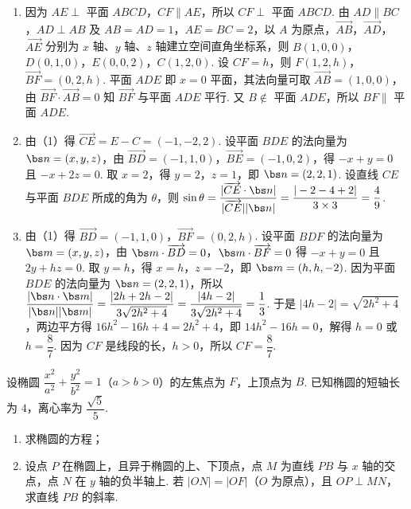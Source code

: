 \begin{solution}
\begin{enumerate}
\item 因为 \(AE\perp\) 平面 \(ABCD\)，\(CF\parallel AE\)，所以 \(CF\perp\) 平面 \(ABCD\). 由 \(AD\parallel BC\)，\(AD\perp AB\) 及 \(AB=AD=1\)，\(AE=BC=2\)，以 \(A\) 为原点，\(\overrightarrow{AB}\)，\(\overrightarrow{AD}\)，\(\overrightarrow{AE}\) 分别为 \(x\) 轴、\(y\) 轴、\(z\) 轴建立空间直角坐标系，则 \(B(1,0,0)\)，\(D(0,1,0)\)，\(E(0,0,2)\)，\(C(1,2,0)\). 设 \(CF=h\)，则 \(F(1,2,h)\)，\(\overrightarrow{BF}=(0,2,h)\). 平面 \(ADE\) 即 \(x=0\) 平面，其法向量可取 \(\overrightarrow{AB}=(1,0,0)\)，由 \(\overrightarrow{BF}\cdot\overrightarrow{AB}=0\) 知 \(\overrightarrow{BF}\) 与平面 \(ADE\) 平行. 又 \(B\notin\) 平面 \(ADE\)，所以 \(BF\parallel\) 平面 \(ADE\).
\item 由（1）得 \(\overrightarrow{CE}=E-C=(-1,-2,2)\). 设平面 \(BDE\) 的法向量为 \(\bs n=(x,y,z)\)，由 \(\overrightarrow{BD}=(-1,1,0)\)，\(\overrightarrow{BE}=(-1,0,2)\)，得 \(-x+y=0\) 且 \(-x+2z=0\). 取 \(x=2\)，得 \(y=2\)，\(z=1\)，即 \(\bs n=(2,2,1)\). 设直线 \(CE\) 与平面 \(BDE\) 所成的角为 \(\theta\)，则 \(\sin\theta=\dfrac{|\overrightarrow{CE}\cdot\bs n|}{|\overrightarrow{CE}||\bs n|}=\dfrac{|-2-4+2|}{3\times3}=\dfrac49\).
\item 由（1）得 \(\overrightarrow{BD}=(-1,1,0)\)，\(\overrightarrow{BF}=(0,2,h)\). 设平面 \(BDF\) 的法向量为 \(\bs m=(x,y,z)\)，由 \(\bs m\cdot\overrightarrow{BD}=0\)，\(\bs m\cdot\overrightarrow{BF}=0\) 得 \(-x+y=0\) 且 \(2y+hz=0\). 取 \(y=h\)，得 \(x=h\)，\(z=-2\)，即 \(\bs m=(h,h,-2)\). 因为平面 \(BDE\) 的法向量为 \(\bs n=(2,2,1)\)，所以 \(\dfrac{|\bs n\cdot\bs m|}{|\bs n||\bs m|}=\dfrac{|2h+2h-2|}{3\sqrt{2h^2+4}}=\dfrac{|4h-2|}{3\sqrt{2h^2+4}}=\dfrac13\). 于是 \(|4h-2|=\sqrt{2h^2+4}\)，两边平方得 \(16h^2-16h+4=2h^2+4\)，即 \(14h^2-16h=0\)，解得 \(h=0\) 或 \(h=\dfrac87\). 因为 \(CF\) 是线段的长，\(h>0\)，所以 \(CF=\dfrac87\).
\end{enumerate}
\end{solution}


\begin{problem}
设椭圆 \( \dfrac{x^2}{a^2}+\dfrac{y^2}{b^2}=1 \)（\( a>b>0 \)）的左焦点为 \(F\)，上顶点为 \(B\). 已知椭圆的短轴长为 \( 4 \)，离心率为 \( \dfrac{\sqrt5}{5} \).

\begin{enumerate}
\item 求椭圆的方程；
\item 设点 \(P\) 在椭圆上，且异于椭圆的上、下顶点，点 \(M\) 为直线 \(PB\) 与 \( x \) 轴的交点，点 \(N\) 在 \( y \) 轴的负半轴上. 若 \( |ON|=|OF| \)（\(O\) 为原点），且 \( OP\perp MN \)，求直线 \(PB\) 的斜率.
\end{enumerate}
\end{problem}

